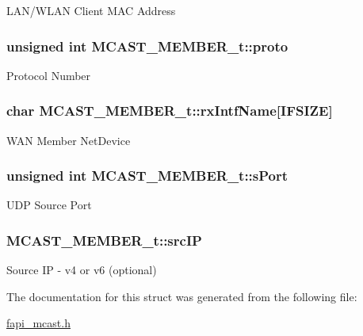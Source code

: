 L\-A\-N/\-W\-L\-A\-N Client M\-A\-C Address \hypertarget{structMCAST__MEMBER__t_a451fba306b8ff40473c5927a05e299f6}{
\subsubsection[{proto}]{\setlength{\rightskip}{0pt plus 5cm}unsigned int M\-C\-A\-S\-T\-\_\-\-M\-E\-M\-B\-E\-R\-\_\-t\-::proto}}\label{structMCAST__MEMBER__t_a451fba306b8ff40473c5927a05e299f6}
Protocol Number \hypertarget{structMCAST__MEMBER__t_ab0297b5fb862c50e7624b0df5162b4fa}{
\subsubsection[{rx\-Intf\-Name}]{\setlength{\rightskip}{0pt plus 5cm}char M\-C\-A\-S\-T\-\_\-\-M\-E\-M\-B\-E\-R\-\_\-t\-::rx\-Intf\-Name\mbox{[}{\bf I\-F\-S\-I\-Z\-E}\mbox{]}}}\label{structMCAST__MEMBER__t_ab0297b5fb862c50e7624b0df5162b4fa}
W\-A\-N Member Net\-Device \hypertarget{structMCAST__MEMBER__t_acaa4ac9a1eb240ab6c1328f754c3628d}{
\subsubsection[{s\-Port}]{\setlength{\rightskip}{0pt plus 5cm}unsigned int M\-C\-A\-S\-T\-\_\-\-M\-E\-M\-B\-E\-R\-\_\-t\-::s\-Port}}\label{structMCAST__MEMBER__t_acaa4ac9a1eb240ab6c1328f754c3628d}
U\-D\-P Source Port \hypertarget{structMCAST__MEMBER__t_a02d8c40017220d42cb82938036e7da3b}{
\subsubsection[{src\-I\-P}]{ M\-C\-A\-S\-T\-\_\-\-M\-E\-M\-B\-E\-R\-\_\-t\-::src\-I\-P}}\label{structMCAST__MEMBER__t_a02d8c40017220d42cb82938036e7da3b}
Source I\-P -\/ v4 or v6 (optional) 

The documentation for this struct was generated from the following file\-:\begin{DoxyCompactItemize}
\item 
\hyperlink{fapi__mcast_8h}{fapi\-\_\-mcast.\-h}\end{DoxyCompactItemize}
